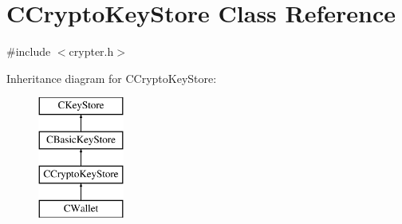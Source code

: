 \hypertarget{class_c_crypto_key_store}{}\section{C\+Crypto\+Key\+Store Class Reference}
\label{class_c_crypto_key_store}


{\ttfamily \#include $<$crypter.\+h$>$}

Inheritance diagram for C\+Crypto\+Key\+Store\+:\begin{figure}[H]
\begin{center}
\leavevmode
\includegraphics[height=4.000000cm]{class_c_crypto_key_store}
\end{center}
\end{figure}
